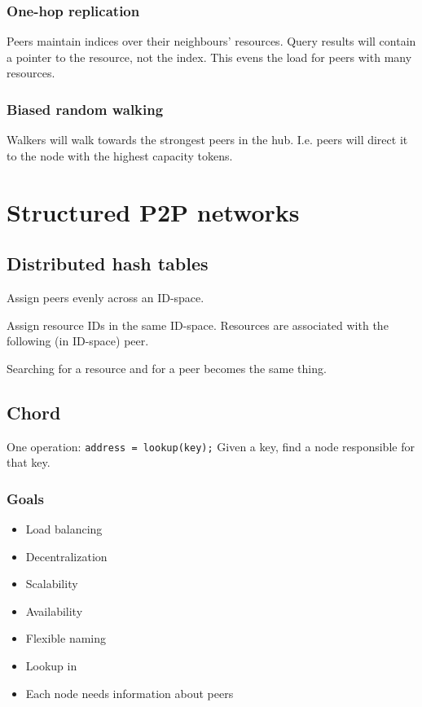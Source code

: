 	\subsection{One-hop replication}
	Peers maintain indices over their neighbours' resources. Query results will contain a pointer to the resource, not the index. This evens the load for peers with many resources. 
	
	\subsection{Biased random walking}
	Walkers will walk towards the strongest peers in the hub. I.e. peers will direct it to the node with the highest capacity tokens.
	
	\chapter{Structured P2P networks}
	
	\section{Distributed hash tables}
	Assign peers evenly across an ID-space.
	
	Assign resource IDs in the same ID-space. Resources are associated with the following (in ID-space) peer.
	
	Searching for a resource and for a peer becomes the same thing.
	
	\section{Chord}
	One operation: \texttt{address = lookup(key);} Given a key, find a node responsible for that key.
	
	\subsection{Goals}
	\begin{itemize}
		\item Load balancing
		\item Decentralization
		\item Scalability
		\item Availability
		\item Flexible naming
		\item Lookup in 
		\item Each node needs information about  peers
	\end{itemize}
	
